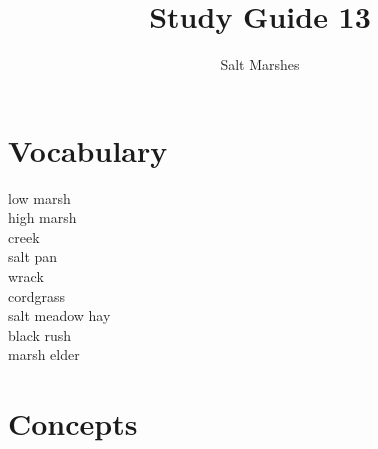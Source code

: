 \documentclass[nofonts, letterpaper]{tufte-handout}
\title{Study Guide 13}%
\author{Salt Marshes}
\date{} %
\begin{document}
\maketitle	%


\section{Vocabulary}
\vspace{-1\baselineskip}
\begin{multicols}{2}
low marsh \\
high marsh \\
creek \\
salt pan \\
wrack \\
cordgrass \\
salt meadow hay \\
black rush \\
marsh elder
\end{multicols}

\section{Concepts}
\end{document}
